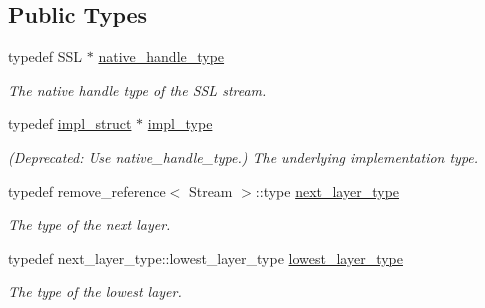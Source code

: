 \subsection*{Public Types}
\begin{DoxyCompactItemize}
\item 
typedef S\+S\+L $\ast$ \hyperlink{classasio_1_1ssl_1_1stream_ad10bd7f631ed0704388d4dd90b5f3342}{native\+\_\+handle\+\_\+type}
\begin{DoxyCompactList}\small\item\em The native handle type of the S\+S\+L stream. \end{DoxyCompactList}\item 
typedef \hyperlink{structasio_1_1ssl_1_1stream_1_1impl__struct}{impl\+\_\+struct} $\ast$ \hyperlink{classasio_1_1ssl_1_1stream_ab97c7dbb5b2ffcf9ee0e63ddc8481ab7}{impl\+\_\+type}
\begin{DoxyCompactList}\small\item\em (Deprecated\+: Use native\+\_\+handle\+\_\+type.) The underlying implementation type. \end{DoxyCompactList}\item 
typedef remove\+\_\+reference$<$ Stream $>$\+::type \hyperlink{classasio_1_1ssl_1_1stream_ae0c066ed414d0d7898b9d2e7998ef98e}{next\+\_\+layer\+\_\+type}
\begin{DoxyCompactList}\small\item\em The type of the next layer. \end{DoxyCompactList}\item 
typedef next\+\_\+layer\+\_\+type\+::lowest\+\_\+layer\+\_\+type \hyperlink{classasio_1_1ssl_1_1stream_ae3642d059991c8d0285b888673c677ca}{lowest\+\_\+layer\+\_\+type}
\begin{DoxyCompactList}\small\item\em The type of the lowest layer. \end{DoxyCompactList}\end{DoxyCompactItemize}
